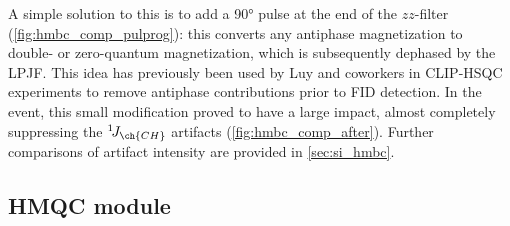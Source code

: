 \documentclass[a4paper,11pt]{article}
\newcommand{\carbon}{\ch{^{13}C}}
\newcommand{\nitrogen}{\ch{^{15}N}}
\newcommand{\onejch}{{}^1\!J_{\ch{CH}}}
\begin{document}
\begin{refsection}
A simple solution to this is to add a \carbon{} \ang{90} pulse at the end of the \(zz\)-filter (\cref{fig:hmbc_comp_pulprog}): this converts any antiphase magnetization to double- or zero-quantum magnetization, which is subsequently dephased by the LPJF.
This idea has previously been used by Luy and coworkers in CLIP-HSQC experiments to remove antiphase contributions prior to FID detection.\autocite{Enthart2008JMR}
In the event, this small modification proved to have a large impact, almost completely suppressing the \(\onejch\) artifacts (\cref{fig:hmbc_comp_after}).
Further comparisons of artifact intensity are provided in \cref{sec:si_hmbc}.

\subsection{\texorpdfstring{\nitrogen{}}{15N} HMQC module}


\end{refsection}
\end{document}
